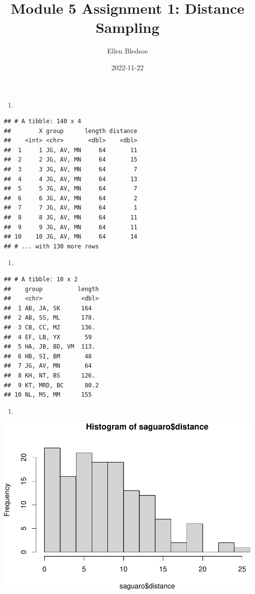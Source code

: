 \documentclass[
]{article}
\title{Module 5 Assignment 1: Distance Sampling}
\author{Ellen Bledsoe}
\date{2022-11-22}
\providecommand{\tightlist}{%
  \setlength{\itemsep}{0pt}\setlength{\parskip}{0pt}}
\begin{document}
\maketitle

\begin{enumerate}
\def\labelenumi{\arabic{enumi}.}
\tightlist
\item
\end{enumerate}

\begin{verbatim}
## # A tibble: 140 x 4
##        X group      length distance
##    <int> <chr>       <dbl>    <dbl>
##  1     1 JG, AV, MN     64       11
##  2     2 JG, AV, MN     64       15
##  3     3 JG, AV, MN     64        7
##  4     4 JG, AV, MN     64       13
##  5     5 JG, AV, MN     64        7
##  6     6 JG, AV, MN     64        2
##  7     7 JG, AV, MN     64        1
##  8     8 JG, AV, MN     64       11
##  9     9 JG, AV, MN     64       11
## 10    10 JG, AV, MN     64       14
## # ... with 130 more rows
\end{verbatim}

\begin{enumerate}
\def\labelenumi{\arabic{enumi}.}
\setcounter{enumi}{1}
\tightlist
\item
\end{enumerate}

\begin{verbatim}
## # A tibble: 10 x 2
##    group          length
##    <chr>           <dbl>
##  1 AB, JA, SK      164  
##  2 AB, SS, ML      178. 
##  3 CB, CC, MZ      136. 
##  4 EF, LB, YX       59  
##  5 HA, JB, BD, VM  113. 
##  6 HB, SI, BM       48  
##  7 JG, AV, MN       64  
##  8 KH, NT, BS      126. 
##  9 KT, MRD, BC      80.2
## 10 NL, MS, MM      155
\end{verbatim}

\begin{enumerate}
\def\labelenumi{\arabic{enumi}.}
\setcounter{enumi}{2}
\tightlist
\item
\end{enumerate}

\includegraphics{Module5_Assignment1_AnswerKey_files/figure-latex/unnamed-chunk-4-1.pdf}
\end{document}
